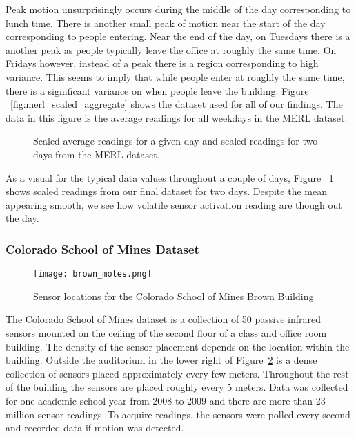 Peak motion unsurprisingly occurs during the middle of the day corresponding to lunch time.  There is another small peak of motion near the start of the day corresponding to people entering.  Near the end of the day, on Tuesdays there is a another peak as people typically leave the office at roughly the same time.  On Fridays however, instead of a peak there is a region corresponding to high variance.  This seems to imply that while people enter at roughly the same time, there is a significant variance on when people leave the building.  Figure ~\ref{fig:merl_scaled_aggregate} shows the dataset used for all of our findings.  The data in this figure is the average readings for all weekdays in the MERL dataset.  

\begin{figure}[!ht]
	\begin{center}
		\label{fig:merl_scaled_aggregate}
		\label{fig:merl_scaled_raw}
	\end{center}
	\caption{Scaled average readings for a given day and scaled readings for two days from the MERL dataset.}
\end{figure}

As a visual for the typical data values throughout a couple of days, Figure ~\ref{fig:merl_scaled_raw}  shows scaled readings from our final dataset for two days.  Despite the mean appearing smooth, we see how volatile sensor activation reading are though out the day.


\subsubsection{Colorado School of Mines Dataset}

\begin{figure}[t!]
	\begin{center}
		\texttt{[image: brown\_motes.png]}
	\end{center}
	\caption{Sensor locations for the Colorado School of Mines Brown Building}
	\label{fig:csmbbfloor}
\end{figure}

The Colorado School of Mines dataset is a collection of 50 passive infrared sensors mounted on the ceiling of the second floor of a class and office room building.  The density of the sensor placement depends on the location within the building.  Outside the auditorium in the lower right of Figure~\ref{fig:csmbbfloor} is a dense collection of sensors placed approximately every few meters.  Throughout the rest of the building the sensors are placed roughly every 5 meters.  Data was collected for one academic school year from 2008 to 2009 and there are more than 23 million sensor readings.  To acquire readings, the sensors were polled every second and recorded data if motion was detected.  

